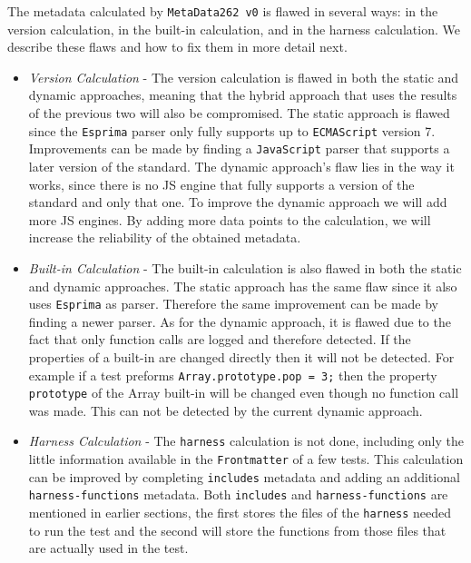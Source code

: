 \documentclass[runningheads]{llncs}
\begin{document}
The metadata calculated by \texttt{MetaData262 v0} is flawed in several ways: in the version calculation, in the built-in calculation, and in the harness calculation. We describe these flaws and how to fix them in more detail next.

\begin{itemize}
\item \emph{Version Calculation} - The version calculation is flawed in both the static and dynamic approaches, meaning that the hybrid approach that uses the results of the previous two will also be compromised. The static approach is flawed since the \texttt{Esprima} parser only fully supports up to \texttt{ECMAScript} version 7. Improvements can be made by finding a \texttt{JavaScript} parser that supports a later version of the standard. The dynamic approach's flaw lies in the way it works, since there is no JS engine that fully supports a version of the standard and only that one. To improve the dynamic approach we will add more JS engines. By adding more data points to the calculation, we will increase the reliability of the obtained metadata.
%
\item \emph{Built-in Calculation} - The built-in calculation is also flawed in both the static and dynamic approaches. The static approach has the same flaw since it also uses \texttt{Esprima} as parser. Therefore the same improvement can be made by finding a newer parser. As for the dynamic approach, it is flawed due to the fact that only function calls are logged and therefore detected. If the properties of a built-in are changed directly then it will not be detected. For example if a test preforms \texttt{Array.prototype.pop = 3;} then the property \texttt{prototype} of the Array built-in will be changed even though no function call was made. This can not be detected by the current dynamic approach.
%
\item \emph{Harness Calculation} - The \texttt{harness} calculation is not done, including only the little information available in the \texttt{Frontmatter} of a few tests. This calculation can be improved by completing \texttt{includes} metadata and adding an additional \texttt{harness-functions} metadata. Both \texttt{includes} and \texttt{harness-functions} are mentioned in earlier sections, the first stores the files of the \texttt{harness} needed to run the test and the second will store the functions from those files that are actually used in the test.
\end{itemize}
\end{document}
